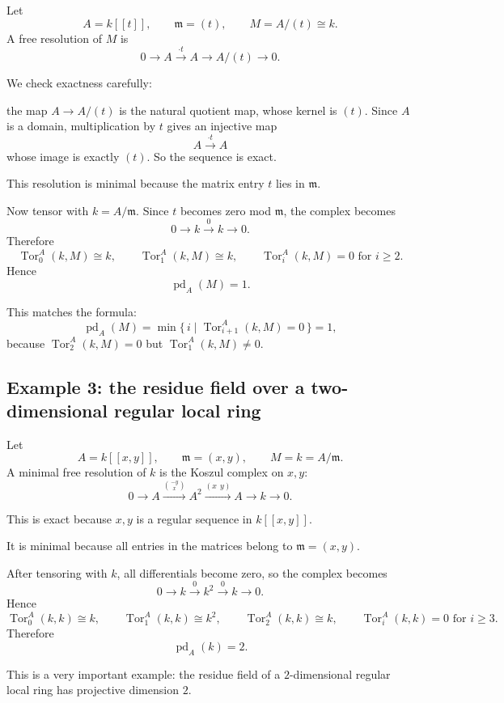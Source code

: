 \documentclass[12pt,a4paper]{article}
\theoremstyle{notespace}
\DeclareMathOperator{\Tor}{Tor}
\begin{document}
Let
\[
A=k[[t]],
\qquad
\mathfrak m=(t),
\qquad
M=A/(t)\cong k.
\]
A free resolution of \(M\) is
\[
0 \longrightarrow A \xrightarrow{\cdot t} A \longrightarrow A/(t) \longrightarrow 0.
\]

We check exactness carefully:

the map \(A\to A/(t)\) is the natural quotient map, whose kernel is \((t)\). Since \(A\) is a domain, multiplication by \(t\) gives an injective map
\[
A \xrightarrow{\cdot t} A
\]
whose image is exactly \((t)\). So the sequence is exact.

This resolution is minimal because the matrix entry \(t\) lies in \(\mathfrak m\).

Now tensor with \(k=A/\mathfrak m\). Since \(t\) becomes zero mod \(\mathfrak m\), the complex becomes
\[
0 \longrightarrow k \xrightarrow{0} k \longrightarrow 0.
\]
Therefore
\[
\Tor_0^A(k,M)\cong k,
\qquad
\Tor_1^A(k,M)\cong k,
\qquad
\Tor_i^A(k,M)=0 \text{ for } i\ge 2.
\]
Hence
\[
\operatorname{pd}_A(M)=1.
\]

This matches the formula:
\[
\operatorname{pd}_A(M)
=
\min \bigl\{\, i \;\big|\; \Tor_{i+1}^A(k,M)=0 \,\bigr\}
=
1,
\]
because \(\Tor_2^A(k,M)=0\) but \(\Tor_1^A(k,M)\neq 0\).

\subsection{Example 3: the residue field over a two-dimensional regular local ring}

Let
\[
A=k[[x,y]],
\qquad
\mathfrak m=(x,y),
\qquad
M=k=A/\mathfrak m.
\]
A minimal free resolution of \(k\) is the Koszul complex on \(x,y\):
\[
0
\longrightarrow
A
\xrightarrow{\binom{-y}{x}}
A^2
\xrightarrow{(x\ \ y)}
A
\longrightarrow
k
\longrightarrow
0.
\]

This is exact because \(x,y\) is a regular sequence in \(k[[x,y]]\).

It is minimal because all entries in the matrices belong to \(\mathfrak m=(x,y)\).

After tensoring with \(k\), all differentials become zero, so the complex becomes
\[
0 \longrightarrow k \xrightarrow{0} k^2 \xrightarrow{0} k \longrightarrow 0.
\]
Hence
\[
\Tor_0^A(k,k)\cong k,
\qquad
\Tor_1^A(k,k)\cong k^2,
\qquad
\Tor_2^A(k,k)\cong k,
\qquad
\Tor_i^A(k,k)=0 \text{ for } i\ge 3.
\]
Therefore
\[
\operatorname{pd}_A(k)=2.
\]

This is a very important example: the residue field of a \(2\)-dimensional regular local ring has projective dimension \(2\).
\end{document}
